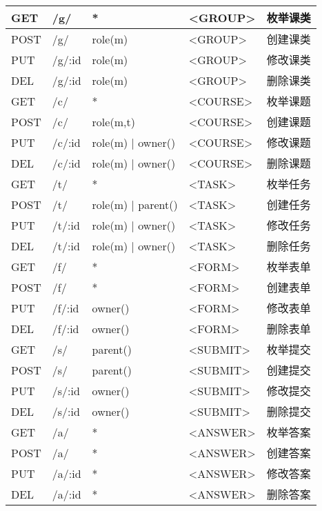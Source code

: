 \begin{longtable}{|p{1.2cm}|p{3cm}|p{3cm}|p{4cm}|X|}
  GET  & /g/    & *       & <GROUP> & 枚举课类 \\ \hline
  POST & /g/    & role(m) & <GROUP> & 创建课类 \\ \hline
  PUT  & /g/:id & role(m) & <GROUP> & 修改课类 \\ \hline
  DEL  & /g/:id & role(m) & <GROUP> & 删除课类 \\ \hline

  GET  & /c/    & *                 & <COURSE> & 枚举课题 \\ \hline
  POST & /c/    & role(m,t)         & <COURSE> & 创建课题 \\ \hline
  PUT  & /c/:id & role(m) | owner() & <COURSE> & 修改课题 \\ \hline
  DEL  & /c/:id & role(m) | owner() & <COURSE> & 删除课题 \\ \hline

  GET  & /t/    & *                  & <TASK> & 枚举任务 \\ \hline
  POST & /t/    & role(m) | parent() & <TASK> & 创建任务 \\ \hline
  PUT  & /t/:id & role(m) | owner()  & <TASK> & 修改任务 \\ \hline
  DEL  & /t/:id & role(m) | owner()  & <TASK> & 删除任务 \\ \hline

  GET  & /f/    & *       & <FORM> & 枚举表单 \\ \hline
  POST & /f/    & *       & <FORM> & 创建表单 \\ \hline
  PUT  & /f/:id & owner() & <FORM> & 修改表单 \\ \hline
  DEL  & /f/:id & owner() & <FORM> & 删除表单 \\ \hline

  GET  & /s/    & parent() & <SUBMIT> & 枚举提交 \\ \hline
  POST & /s/    & parent() & <SUBMIT> & 创建提交 \\ \hline
  PUT  & /s/:id & owner()  & <SUBMIT> & 修改提交 \\ \hline
  DEL  & /s/:id & owner()  & <SUBMIT> & 删除提交 \\ \hline

  GET  & /a/    & * & <ANSWER> & 枚举答案 \\ \hline
  POST & /a/    & * & <ANSWER> & 创建答案 \\ \hline
  PUT  & /a/:id & * & <ANSWER> & 修改答案 \\ \hline
  DEL  & /a/:id & * & <ANSWER> & 删除答案 \\ \hline


\end{longtable}
